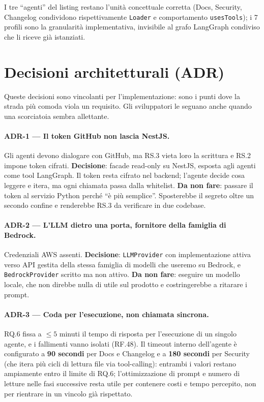 \documentclass[11pt,a4paper]{article}
\begin{document}
I tre ``agenti'' del listing restano l'unità concettuale corretta (Docs, Security, Changelog condividono rispettivamente \texttt{Loader} e comportamento \texttt{usesTools}); i 7 profili sono la granularità implementativa, invisibile al grafo LangGraph condiviso che li riceve già istanziati.

\section{Decisioni architetturali (ADR)}
\label{sec:adr}

Queste decisioni sono vincolanti per l'implementazione: sono i punti dove la strada più comoda viola un requisito. Gli sviluppatori le seguano anche quando una scorciatoia sembra allettante.

\paragraph{ADR-1 --- Il token GitHub non lascia NestJS.} Gli agenti devono dialogare con GitHub, ma RS.3 vieta loro la scrittura e RS.2 impone token cifrati. \textbf{Decisione}: facade read-only su NestJS, esposta agli agenti come tool LangGraph. Il token resta cifrato nel backend; l'agente decide cosa leggere e itera, ma ogni chiamata passa dalla whitelist. \textbf{Da non fare}: passare il token al servizio Python perché ``è più semplice''. Sposterebbe il segreto oltre un secondo confine e renderebbe RS.3 da verificare in due codebase.

\paragraph{ADR-2 --- L'LLM dietro una porta, fornitore della famiglia di Bedrock.} Credenziali AWS assenti. \textbf{Decisione}: \texttt{LLMProvider} con implementazione attiva verso API gestita della stessa famiglia di modelli che useremo su Bedrock, e \texttt{BedrockProvider} scritto ma non attivo. \textbf{Da non fare}: eseguire un modello locale, che non direbbe nulla di utile sul prodotto e costringerebbe a ritarare i prompt.

\paragraph{ADR-3 --- Coda per l'esecuzione, non chiamata sincrona.}\label{sub:adr3} RQ.6 fissa a $\leq 5$ minuti il tempo di risposta per l'esecuzione di un singolo agente, e i fallimenti vanno isolati (RF.48). Il timeout interno dell'agente è configurato a \textbf{90 secondi} per Docs e Changelog e a \textbf{180 secondi} per Security (che itera più cicli di lettura file via tool-calling): entrambi i valori restano ampiamente entro il limite di RQ.6; l'ottimizzazione di prompt e numero di letture nelle fasi successive resta utile per contenere costi e tempo percepito, non per rientrare in un vincolo già rispettato.
\end{document}
